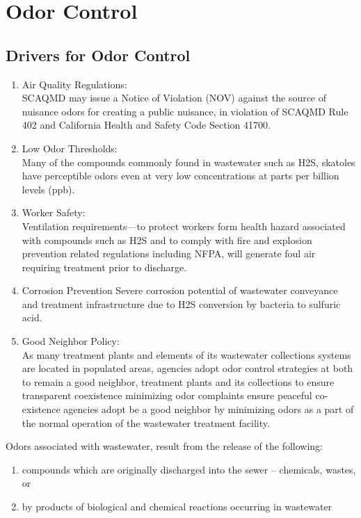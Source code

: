 \chapter{Odor Control}

\section{Drivers for Odor Control}
\begin{enumerate}
\item Air Quality Regulations:\\
SCAQMD may issue a Notice of Violation (NOV) against the source of nuisance odors for creating a public nuisance, in violation of SCAQMD Rule 402 and California Health and Safety Code Section 41700.\\
\item Low Odor Thresholds:\\
Many of the compounds commonly found in wastewater such as H2S, skatoles have perceptible odors even at very low concentrations at parts per billion levels (ppb).\\
\item Worker Safety:\\
Ventilation requirements—to protect workers form health hazard associated with compounds such as H2S and to comply with fire and explosion prevention related regulations including NFPA, will generate foul air requiring treatment prior to discharge.\\
\item Corrosion Prevention
Severe corrosion potential of wastewater conveyance and treatment infrastructure due to H2S conversion by bacteria to sulfuric acid.\\
\item Good Neighbor Policy:\\
As many treatment plants and elements of its wastewater collections systems are located in populated areas, agencies adopt odor control strategies at both to remain a good neighbor, treatment plants and its collections to ensure transparent coexistence  minimizing odor complaints  ensure peaceful co-existence agencies adopt be a good neighbor by minimizing odors as a part of the normal operation of the wastewater treatment facility. \\
\end{enumerate}

Odors associated with wastewater, result from the release of the following:
\begin{enumerate}
\item compounds which are originally discharged into the sewer – chemicals, wastes, or 
\item by products of biological and chemical reactions occurring in wastewater
\end{enumerate}

